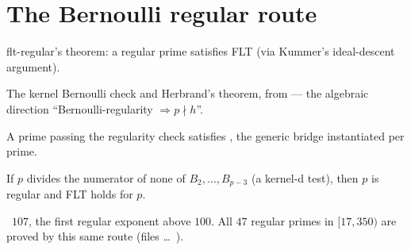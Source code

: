 \blueprintfrontmatter

\begin{abstract}
 certifies FLT for the \emph{regular} primes
$17 \le q < 350$ by a cheap route: a kernel Bernoulli-numerator check discharges
regularity, and \textsf{flt-regular} supplies FLT for regular primes. It reuses
the shared Bernoulli/Herbrand base of  (external leaves).
\end{abstract}

\section{The Bernoulli regular route}

\begin{definition}\label{ext:fltregular}
  \leanok
  \textsf{flt-regular}'s theorem: a regular prime satisfies FLT (via Kummer's
  ideal-descent argument).
\end{definition}

\begin{definition}\label{ext:bernbase}
  \leanok
  The kernel Bernoulli check  and Herbrand's
  theorem, from  --- the algebraic direction
  ``Bernoulli-regularity $\Rightarrow p \nmid h$''.
\end{definition}

\begin{theorem}\label{thm:regcheck}
  \leanok
  A prime passing the regularity check satisfies , the
  generic bridge instantiated per prime.
\end{theorem}

\begin{theorem}\label{thm:bernoulli}
  \leanok
  If $p$ divides the numerator of none of $B_2,\dots,B_{p-3}$ (a kernel-d
  test), then $p$ is regular and FLT holds for $p$.
\end{theorem}

\begin{theorem}\label{thm:flt107}
  \leanok
  ~$107$, the first regular exponent above $100$. All
  $47$ regular primes in $[17, 350)$ are proved by this same route (files
   \dots\ ).
\end{theorem}
